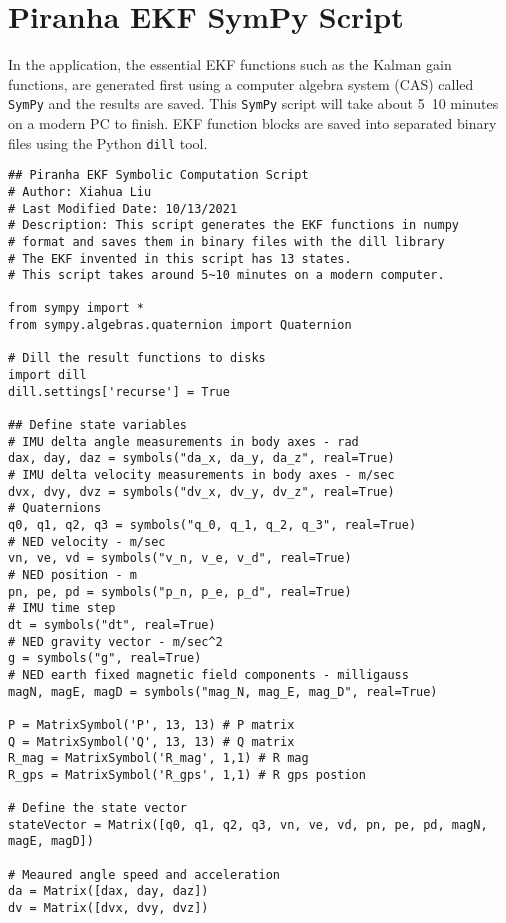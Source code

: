 \label{app:ekf-sympy}
\chapter{Piranha EKF SymPy Script}

In the application, the essential EKF functions such as the Kalman gain functions, are generated first using a computer algebra system (CAS) called \texttt{SymPy} and the results are saved. This \texttt{SymPy} script will take about 5~10 minutes on a modern PC to finish. EKF function blocks are saved into separated binary files using the Python \texttt{dill} tool.

\renewcommand{\baselinestretch}{1}\selectfont
\begin{verbatim}
## Piranha EKF Symbolic Computation Script
# Author: Xiahua Liu
# Last Modified Date: 10/13/2021
# Description: This script generates the EKF functions in numpy
# format and saves them in binary files with the dill library
# The EKF invented in this script has 13 states.
# This script takes around 5~10 minutes on a modern computer.

from sympy import *
from sympy.algebras.quaternion import Quaternion

# Dill the result functions to disks
import dill
dill.settings['recurse'] = True

## Define state variables
# IMU delta angle measurements in body axes - rad
dax, day, daz = symbols("da_x, da_y, da_z", real=True)
# IMU delta velocity measurements in body axes - m/sec
dvx, dvy, dvz = symbols("dv_x, dv_y, dv_z", real=True)
# Quaternions
q0, q1, q2, q3 = symbols("q_0, q_1, q_2, q_3", real=True)
# NED velocity - m/sec
vn, ve, vd = symbols("v_n, v_e, v_d", real=True)   
# NED position - m
pn, pe, pd = symbols("p_n, p_e, p_d", real=True)  
# IMU time step 
dt = symbols("dt", real=True)    
# NED gravity vector - m/sec^2
g = symbols("g", real=True)    
# NED earth fixed magnetic field components - milligauss
magN, magE, magD = symbols("mag_N, mag_E, mag_D", real=True)    

P = MatrixSymbol('P', 13, 13) # P matrix
Q = MatrixSymbol('Q', 13, 13) # Q matrix
R_mag = MatrixSymbol('R_mag', 1,1) # R mag 
R_gps = MatrixSymbol('R_gps', 1,1) # R gps postion 

# Define the state vector
stateVector = Matrix([q0, q1, q2, q3, vn, ve, vd, pn, pe, pd, magN, magE, magD])

# Meaured angle speed and acceleration
da = Matrix([dax, day, daz])
dv = Matrix([dvx, dvy, dvz])


\end{verbatim}

